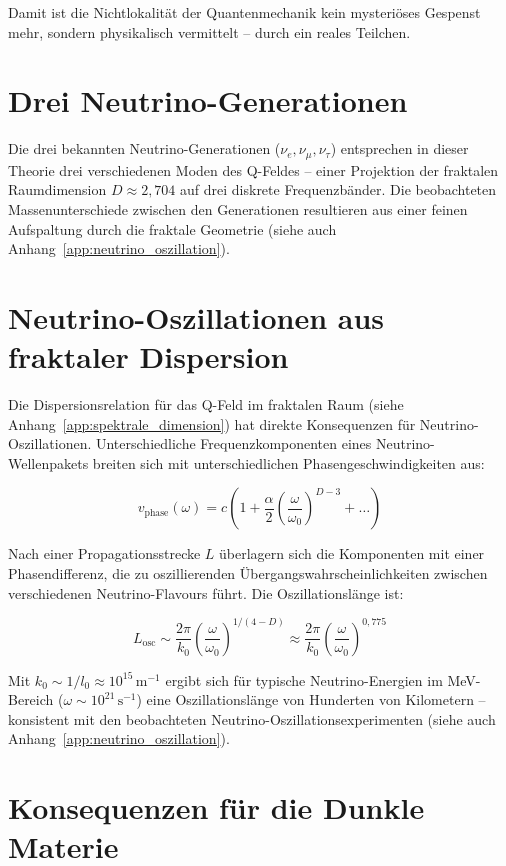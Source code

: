 Damit ist die Nichtlokalität der Quantenmechanik kein mysteriöses Gespenst mehr, sondern physikalisch vermittelt – durch ein reales Teilchen.

\section{Drei Neutrino-Generationen}
\label{sec:nu_generationen}

Die drei bekannten Neutrino-Generationen (\( \nu_e, \nu_\mu, \nu_\tau \)) entsprechen in dieser Theorie drei verschiedenen Moden des Q-Feldes – einer Projektion der fraktalen Raumdimension \( D \approx 2,704 \) auf drei diskrete Frequenzbänder. Die beobachteten Massenunterschiede zwischen den Generationen resultieren aus einer feinen Aufspaltung durch die fraktale Geometrie (siehe auch Anhang~\ref{app:neutrino_oszillation}).

\section{Neutrino-Oszillationen aus fraktaler Dispersion}
\label{sec:nu_oszillationen}

Die Dispersionsrelation für das Q-Feld im fraktalen Raum (siehe Anhang~\ref{app:spektrale_dimension}) hat direkte Konsequenzen für Neutrino-Oszillationen. Unterschiedliche Frequenzkomponenten eines Neutrino-Wellenpakets breiten sich mit unterschiedlichen Phasengeschwindigkeiten aus:

\[
v_{\text{phase}}(\omega) = c \left( 1 + \frac{\alpha}{2} \left( \frac{\omega}{\omega_0} \right)^{D-3} + \dots \right)
\]

Nach einer Propagationsstrecke \( L \) überlagern sich die Komponenten mit einer Phasendifferenz, die zu oszillierenden Übergangswahrscheinlichkeiten zwischen verschiedenen Neutrino-Flavours führt. Die Oszillationslänge ist:

\[
L_{\text{osc}} \sim \frac{2\pi}{k_0} \left( \frac{\omega}{\omega_0} \right)^{1/(4-D)} \approx \frac{2\pi}{k_0} \left( \frac{\omega}{\omega_0} \right)^{0,775}
\]

Mit \( k_0 \sim 1/l_0 \approx 10^{15} \, \text{m}^{-1} \) ergibt sich für typische Neutrino-Energien im MeV-Bereich (\( \omega \sim 10^{21} \, \text{s}^{-1} \)) eine Oszillationslänge von Hunderten von Kilometern – konsistent mit den beobachteten Neutrino-Oszillationsexperimenten (siehe auch Anhang~\ref{app:neutrino_oszillation}).

\section{Konsequenzen für die Dunkle Materie}
\label{sec:nu_dunkle_materie}

